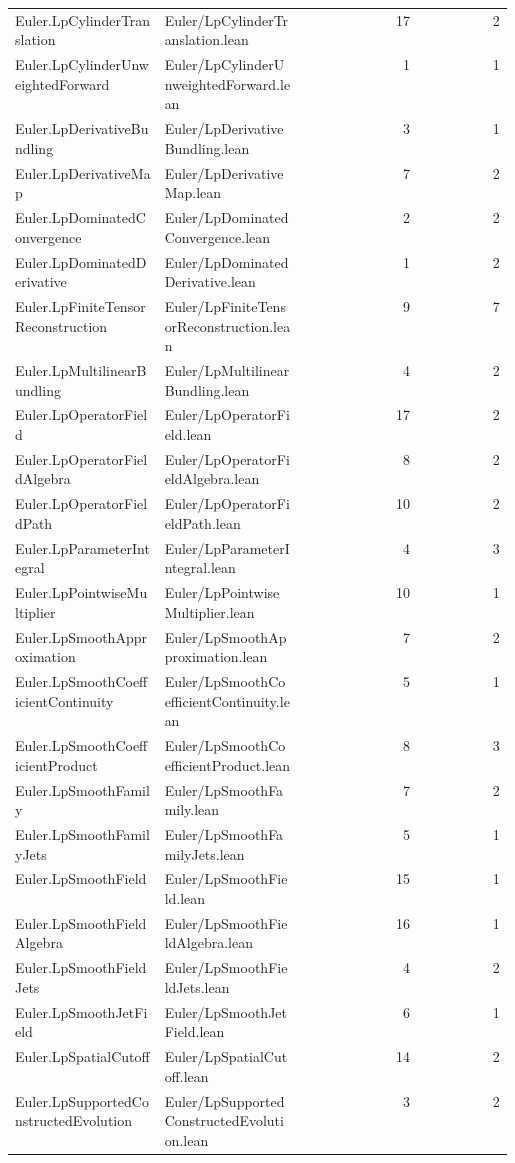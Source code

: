 \begin{longtable}{p{0.30\linewidth}p{0.28\linewidth}rr}
Euler.LpCylinderTranslation & Euler/LpCylinderTranslation.lean & 17 & 2\\
Euler.LpCylinderUnweightedForward & Euler/LpCylinderUnweightedForward.lean & 1 & 1\\
Euler.LpDerivativeBundling & Euler/LpDerivativeBundling.lean & 3 & 1\\
Euler.LpDerivativeMap & Euler/LpDerivativeMap.lean & 7 & 2\\
Euler.LpDominatedConvergence & Euler/LpDominatedConvergence.lean & 2 & 2\\
Euler.LpDominatedDerivative & Euler/LpDominatedDerivative.lean & 1 & 2\\
Euler.LpFiniteTensorReconstruction & Euler/LpFiniteTensorReconstruction.lean & 9 & 7\\
Euler.LpMultilinearBundling & Euler/LpMultilinearBundling.lean & 4 & 2\\
Euler.LpOperatorField & Euler/LpOperatorField.lean & 17 & 2\\
Euler.LpOperatorFieldAlgebra & Euler/LpOperatorFieldAlgebra.lean & 8 & 2\\
Euler.LpOperatorFieldPath & Euler/LpOperatorFieldPath.lean & 10 & 2\\
Euler.LpParameterIntegral & Euler/LpParameterIntegral.lean & 4 & 3\\
Euler.LpPointwiseMultiplier & Euler/LpPointwiseMultiplier.lean & 10 & 1\\
Euler.LpSmoothApproximation & Euler/LpSmoothApproximation.lean & 7 & 2\\
Euler.LpSmoothCoefficientContinuity & Euler/LpSmoothCoefficientContinuity.lean & 5 & 1\\
Euler.LpSmoothCoefficientProduct & Euler/LpSmoothCoefficientProduct.lean & 8 & 3\\
Euler.LpSmoothFamily & Euler/LpSmoothFamily.lean & 7 & 2\\
Euler.LpSmoothFamilyJets & Euler/LpSmoothFamilyJets.lean & 5 & 1\\
Euler.LpSmoothField & Euler/LpSmoothField.lean & 15 & 1\\
Euler.LpSmoothFieldAlgebra & Euler/LpSmoothFieldAlgebra.lean & 16 & 1\\
Euler.LpSmoothFieldJets & Euler/LpSmoothFieldJets.lean & 4 & 2\\
Euler.LpSmoothJetField & Euler/LpSmoothJetField.lean & 6 & 1\\
Euler.LpSpatialCutoff & Euler/LpSpatialCutoff.lean & 14 & 2\\
Euler.LpSupportedConstructedEvolution & Euler/LpSupportedConstructedEvolution.lean & 3 & 2\\

\end{longtable}
